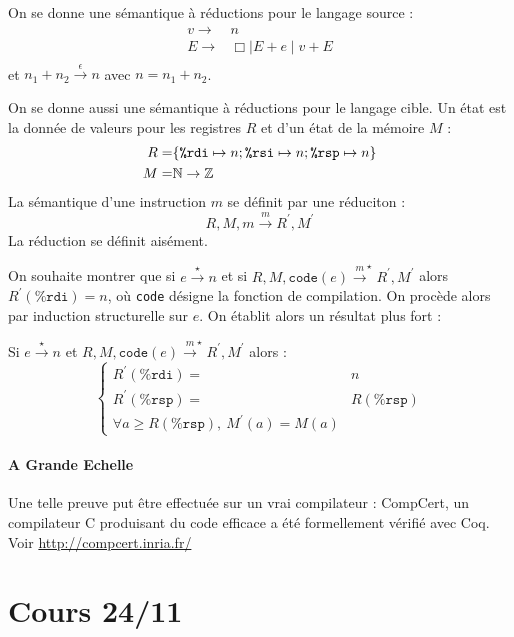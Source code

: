 \documentclass{cours}
\begin{document}
On se donne une sémantique à réductions pour le langage source :
\[
    \begin{aligned}
        v \rightarrow & n                          \\
        E \rightarrow & \Box \mid E + e \mid v + E \\
    \end{aligned}
\]
et $n_{1} + n_{2} \xrightarrow{\epsilon} n$ avec $n = n_{1} +n_{2}$.

On se donne aussi une sémantique à réductions pour le langage cible. Un état est la donnée de valeurs pour les registres $R$ et d'un état de la mémoire $M$ :
\[
    \begin{aligned}
        R = & \{\texttt{\%rdi}\mapsto n; \texttt{\%rsi} \mapsto n; \texttt{\%rsp} \mapsto n\} \\
        M = & \mathbb{N} \rightarrow \mathbb{Z}
    \end{aligned}
\]
La sémantique d'une instruction $m$ se définit par une réduciton :
\[
    R, M, m \xrightarrow{m} R^{'}, M^{'}
\]
La réduction se définit aisément.

On souhaite montrer que si $e\xrightarrow{\star} n$ et si $R, M, \texttt{code}(e) \xrightarrow{m}^{\star} R^{'}, M^{'}$ alors $R^{'}(\texttt{\%rdi}) = n$, où \texttt{code} désigne la fonction de compilation. On procède alors par induction structurelle sur $e$.
On établit alors un résultat plus fort :
\begin{proposition}
    Si $e\xrightarrow{\star} n$ et $R, M, \texttt{code}(e)\xrightarrow{m}^{\star} R^{'}, M^{'}$ alors :
    \[
        \begin{cases}
            R^{'}(\texttt{\%rdi}) = & n                 \\
            R^{'}(\texttt{\%rsp}) = & R(\texttt{\%rsp}) \\
            \forall a \geq R(\texttt{\%rsp}),\ M^{'}(a) = M(a)
        \end{cases}
    \]
\end{proposition}

\subsection{A Grande Echelle}
Une telle preuve put être effectuée sur un vrai compilateur : CompCert, un compilateur C produisant du code efficace a été formellement vérifié avec Coq. Voir \url{http://compcert.inria.fr/}


\part[Compilation des Langages Fonctionnels]{Cours 24/11}
\end{document}
